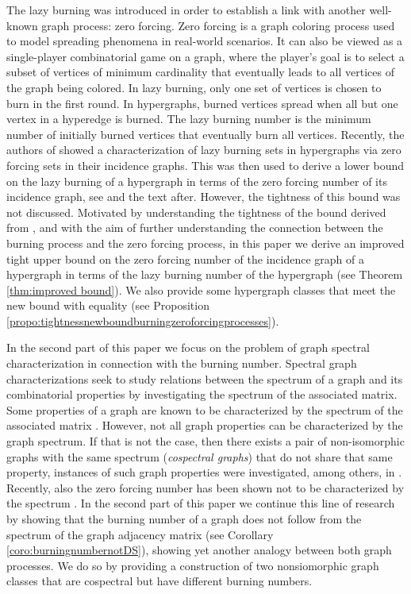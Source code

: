 \documentclass[12pt]{article}
\theoremstyle{plain}
\theoremstyle{definition}
\theoremstyle{remark}
\begin{document}
The lazy burning was introduced in order to establish a link with another well-known graph process: zero forcing. 
Zero forcing is a graph coloring process used to model spreading phenomena in real-world scenarios. It can also be viewed as a single-player combinatorial game on a graph, where the player's goal is to select a subset of vertices of minimum cardinality that eventually leads to all vertices of the graph being colored. In lazy burning, only one set of vertices is chosen to burn in the first round. In hypergraphs, burned vertices spread when all but one vertex in a hyperedge is burned. The lazy burning number is the minimum number of initially burned vertices that eventually burn all vertices. Recently, the authors of \cite{hypergraph} showed a characterization of lazy burning sets in hypergraphs via zero forcing sets in their incidence graphs. This was then used to derive a lower bound on the lazy burning of a hypergraph in terms of the zero forcing number of its incidence graph, see \cite[Theorem 25]{hypergraph} and the text after. However, the tightness of this bound was not discussed. Motivated by understanding the tightness of the bound derived from \cite[Theorem 25]{hypergraph}, and with the aim of further understanding the connection between the burning process and the zero forcing process, in this paper we derive an improved tight upper bound on the zero forcing number of the incidence graph of a hypergraph in terms of the lazy burning number of the hypergraph (see Theorem \ref{thm:improved bound}). We also provide some hypergraph classes that meet the new bound with equality (see Proposition \ref{propo:tightnessnewboundburningzeroforcingprocesses}).

In the second part of this paper we focus on the problem of graph spectral characterization in connection with the burning number. Spectral graph characterizations seek to study relations between the spectrum of a graph and its combinatorial properties by investigating the spectrum of the associated matrix. Some properties of a graph are known to be characterized by the spectrum of the associated matrix \cite{adjacnecy-matrix-strong-product}. However, not all graph properties can be characterized by the graph spectrum. If that is not the case, then there exists a pair of non-isomorphic graphs with the same spectrum (\emph{cospectral graphs}) that do not share that same property, instances of such graph properties were investigated, among others, in \cite{cospectral-regularity,cospectral-hamiltonian,cospectral-matchin}. Recently, also the zero forcing number has been shown not to be characterized by the spectrum \cite{aida-zero-forcing}. In the second part of this paper we continue this line of research by showing that the burning number of a graph does not follow from the spectrum of the graph adjacency matrix (see Corollary \ref{coro:burningnumbernotDS}), showing yet another analogy between both graph processes. We do so by providing a construction of two nonsiomorphic graph classes that are cospectral but have different burning numbers.
\end{document}
